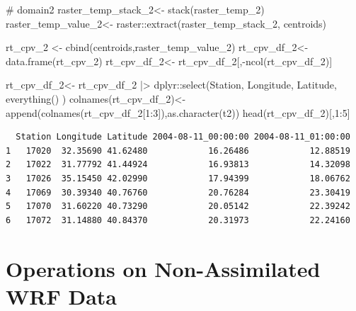 \documentclass[
  letterpaper,
  DIV=11,
  numbers=noendperiod,
  abstract]{scrartcl}
\newenvironment{Shaded}{\begin{snugshade}}{\end{snugshade}}
\newcommand{\CommentTok}[1]{\textcolor[rgb]{0.37,0.37,0.37}{#1}}
\newcommand{\DecValTok}[1]{\textcolor[rgb]{0.68,0.00,0.00}{#1}}
\newcommand{\FunctionTok}[1]{\textcolor[rgb]{0.28,0.35,0.67}{#1}}
\newcommand{\NormalTok}[1]{\textcolor[rgb]{0.00,0.23,0.31}{#1}}
\newcommand{\OtherTok}[1]{\textcolor[rgb]{0.00,0.23,0.31}{#1}}
\newcommand{\SpecialCharTok}[1]{\textcolor[rgb]{0.37,0.37,0.37}{#1}}
\begin{document}
\begin{Shaded}
\begin{Highlighting}[]
\CommentTok{\# domain2}
\NormalTok{raster\_temp\_stack\_2}\OtherTok{\textless{}{-}} \FunctionTok{stack}\NormalTok{(raster\_temp\_2)}
\NormalTok{raster\_temp\_value\_2}\OtherTok{\textless{}{-}}\NormalTok{ raster}\SpecialCharTok{::}\FunctionTok{extract}\NormalTok{(raster\_temp\_stack\_2, centroids)}

\NormalTok{rt\_cpv\_2 }\OtherTok{\textless{}{-}} \FunctionTok{cbind}\NormalTok{(centroids,raster\_temp\_value\_2)}
\NormalTok{rt\_cpv\_df\_2}\OtherTok{\textless{}{-}} \FunctionTok{data.frame}\NormalTok{(rt\_cpv\_2) }
\NormalTok{rt\_cpv\_df\_2}\OtherTok{\textless{}{-}}\NormalTok{ rt\_cpv\_df\_2[,}\SpecialCharTok{{-}}\FunctionTok{ncol}\NormalTok{(rt\_cpv\_df\_2)]}

\NormalTok{rt\_cpv\_df\_2}\OtherTok{\textless{}{-}} 
\NormalTok{  rt\_cpv\_df\_2 }\SpecialCharTok{|\textgreater{}} 
\NormalTok{  dplyr}\SpecialCharTok{::}\FunctionTok{select}\NormalTok{(Station, Longitude, Latitude,  }\FunctionTok{everything}\NormalTok{() )}
\FunctionTok{colnames}\NormalTok{(rt\_cpv\_df\_2)}\OtherTok{\textless{}{-}} \FunctionTok{append}\NormalTok{(}\FunctionTok{colnames}\NormalTok{(rt\_cpv\_df\_2[}\DecValTok{1}\SpecialCharTok{:}\DecValTok{3}\NormalTok{]),}\FunctionTok{as.character}\NormalTok{(t2))}
\FunctionTok{head}\NormalTok{(rt\_cpv\_df\_2)[,}\DecValTok{1}\SpecialCharTok{:}\DecValTok{5}\NormalTok{]}
\end{Highlighting}
\end{Shaded}

\begin{verbatim}
  Station Longitude Latitude 2004-08-11_00:00:00 2004-08-11_01:00:00
1   17020  32.35690 41.62480            16.26486            12.88519
2   17022  31.77792 41.44924            16.93813            14.32098
3   17026  35.15450 42.02990            17.94399            18.06762
4   17069  30.39340 40.76760            20.76284            23.30419
5   17070  31.60220 40.73290            20.05142            22.39242
6   17072  31.14880 40.84370            20.31973            22.24160
\end{verbatim}

\hypertarget{operations-on-non-assimilated-wrf-data}{%
\section{Operations on Non-Assimilated WRF
Data}\label{operations-on-non-assimilated-wrf-data}}
\end{document}
